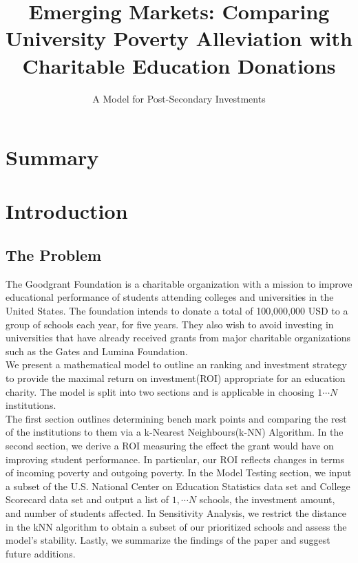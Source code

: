 \documentclass[12pt]{scrartcl}
\title{\vspace{-1.7cm} Emerging Markets: Comparing University Poverty Alleviation with Charitable Education Donations}
\subtitle{A Model for Post-Secondary Investments\vspace{-1.3cm}}
\begin{document}
\maketitle
\thispagestyle{fancy}

\section*{Summary}



\newpage
\tableofcontents
\newpage
	

\section{Introduction}
	\subsection{The Problem}
		The Goodgrant Foundation is a charitable organization with a mission to improve educational performance of students attending colleges and universities in the United States. The foundation intends to donate a total of 100,000,000 USD to a group of schools each year, for five years. They also wish to avoid investing in universities that have already received grants from major charitable organizations such as the Gates and Lumina Foundation.\\
		
		We present a mathematical model to outline an ranking and investment strategy to provide the maximal return on investment(ROI) appropriate for an education charity.  The model is split into two sections and is applicable in choosing $1\cdots N$ institutions. \\

The first section outlines determining bench mark points and comparing the rest of the institutions to them via a k-Nearest Neighbours(k-NN) Algorithm. In the second section, we derive a ROI measuring the effect the grant would have on improving student performance. In particular, our ROI reflects changes in terms of incoming poverty and outgoing poverty. In the Model Testing section, we input a subset of the U.S. National Center on Education Statistics data set and College Scorecard data set and output a list of $1,\cdots{N}$ schools, the investment amount, and number of students affected. In Sensitivity Analysis, we restrict the distance in the kNN algorithm to obtain a subset of our prioritized schools and assess the model's stability. Lastly, we summarize the findings of the paper and suggest future additions. 
	
\end{document}
